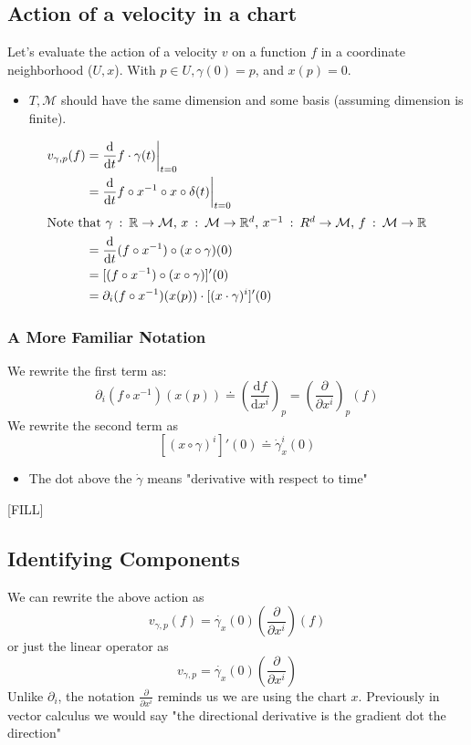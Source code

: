 \documentclass[10pt]{article}
\newcommand{\R}{\mathbb{R}}
\begin{document}
\subsection*{Action of a velocity in a chart}
Let's evaluate the action of a velocity $v$ on a function $f$ in a coordinate neighborhood ($U, x$).  With $p \in U, \gamma(0) = p$, and $x(p) = 0$.
\begin{itemize}
    \item $T, \mathcal{M}$ should have the same dimension and some basis (assuming dimension is finite).
\end{itemize}
\begin{align*}
    v_{\gamma, p}(f) &= \frac{\text{d}}{\text{d}t}f \cdot \gamma(t) \bigg|_{t = 0} \\
    &= \frac{\text{d}}{\text{d}t} f \circ x^{-1} \circ x \circ \delta(t) \bigg|_{t = 0}\\
    \intertext{Note that $\gamma \::\: \R \rightarrow \mathcal{M}$, $x \::\: \mathcal{M} \rightarrow \R^d$, $x^{-1} \::\: R^d \rightarrow \mathcal{M}$, $f \::\: \mathcal{M} \rightarrow \R$}
    &= \frac{\text{d}}{\text{d}t} (f \circ x^{-1}) \circ (x \circ \gamma)(0) \\
    &= [(f \circ x^{-1}) \circ (x \circ \gamma)]'(0)\\
    &= \partial_i (f \circ x^{-1})(x(p)) \cdot [(x \cdot \gamma)^i]'(0)
\end{align*}
\subsubsection*{A More Familiar Notation}
We rewrite the first term as:
\[\partial_i(f \circ x^{-1})(x(p)) \doteq \left(\frac{\text{d}f}{\text{d}x^i}\right)_p = \left(\frac{\partial}{\partial x^i}\right)_p(f)\]
We rewrite the second term as
\[[(x \circ \gamma)^i]'(0) \doteq \dot{\gamma}_x^i(0)\]
\begin{itemize}
    \item The dot above the $\dot{\gamma}$ means "derivative with respect to time"
\end{itemize}
[FILL]

\subsection*{Identifying Components}
We can rewrite the above action as
\[v_{\gamma, p}(f) = \dot{\gamma_x}(0) \left(\frac{\partial}{\partial x^i}\right)(f)\]
or just the linear operator as
\[v_{\gamma, p} = \dot{\gamma_x}(0) \left(\frac{\partial}{\partial x^i}\right)\]
Unlike $\partial_i$, the notation $\frac{\partial}{\partial x^i}$ reminds us we are using the chart $x$.  Previously in vector calculus we would say "the directional derivative is the gradient dot the direction"
\end{document}
